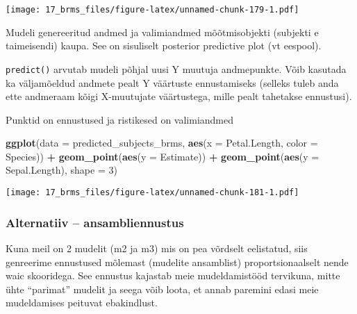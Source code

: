 \documentclass[]{article}
\newenvironment{Shaded}{\begin{snugshade}}{\end{snugshade}}
\newcommand{\KeywordTok}[1]{\textcolor[rgb]{0.13,0.29,0.53}{\textbf{#1}}}
\newcommand{\DataTypeTok}[1]{\textcolor[rgb]{0.13,0.29,0.53}{#1}}
\newcommand{\DecValTok}[1]{\textcolor[rgb]{0.00,0.00,0.81}{#1}}
\newcommand{\StringTok}[1]{\textcolor[rgb]{0.31,0.60,0.02}{#1}}
\newcommand{\OperatorTok}[1]{\textcolor[rgb]{0.81,0.36,0.00}{\textbf{#1}}}
\newcommand{\NormalTok}[1]{#1}
\begin{document}
\texttt{[image: 17\_brms\_files/figure-latex/unnamed-chunk-179-1.pdf]}

Mudeli genereeritud andmed ja valimiandmed mõõtmisobjekti (subjekti e
taimeisendi) kaupa. See on sisuliselt posterior predictive plot (vt
eespool).

\begin{Shaded}
\end{Shaded}

\texttt{predict()} arvutab mudeli põhjal uusi Y muutuja andmepunkte.
Võib kasutada ka väljamõeldud andmete pealt Y väärtuste ennustamiseks
(selleks tuleb anda ette andmeraam kõigi X-muutujate väärtustega, mille
pealt tahetakse ennustusi).

Punktid on ennustused ja ristikesed on valimiandmed

\begin{Shaded}
\begin{Highlighting}[]
\KeywordTok{ggplot}\NormalTok{(}\DataTypeTok{data =}\NormalTok{ predicted_subjects_brms, }\KeywordTok{aes}\NormalTok{(}\DataTypeTok{x =}\NormalTok{ Petal.Length, }\DataTypeTok{color =}\NormalTok{ Species)) }\OperatorTok{+}
\StringTok{  }\KeywordTok{geom_point}\NormalTok{(}\KeywordTok{aes}\NormalTok{(}\DataTypeTok{y =}\NormalTok{ Estimate)) }\OperatorTok{+}
\StringTok{  }\KeywordTok{geom_point}\NormalTok{(}\KeywordTok{aes}\NormalTok{(}\DataTypeTok{y =}\NormalTok{ Sepal.Length), }\DataTypeTok{shape =} \DecValTok{3}\NormalTok{)}
\end{Highlighting}
\end{Shaded}

\texttt{[image: 17\_brms\_files/figure-latex/unnamed-chunk-181-1.pdf]}

\subsubsection{Alternatiiv --
ansambliennustus}\label{alternatiiv-ansambliennustus}

Kuna meil on 2 mudelit (m2 ja m3) mis on pea võrdselt eelistatud, siis
genreerime ennustused mõlemast (mudelite ansamblist) proportsionaalselt
nende waic skooridega. See ennustus kajastab meie mudeldamistööd
tervikuna, mitte ühte ``parimat'' mudelit ja seega võib loota, et annab
paremini edasi meie mudeldamises peituvat ebakindlust.
\end{document}
